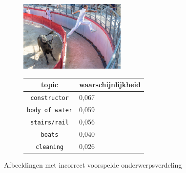 \begin{figure}
\begin{subfigure}{\textwidth}
    \centering
    \begin{minipage}[t][3.5cm]{.5\linewidth}
    \centering
    \vspace{0pt}
    \includegraphics[height=3.5cm]{Images/LDA/7446693604.jpg}
    \end{minipage}\hfill
    \begin{minipage}[t]{.5\textwidth}
    \centering
    \vspace{0pt}
    \begin{tabular}{cl}
            topic                           & waarschijnlijkheid\\
            \hline
            \texttt{constructor}             & 0,067 \\
            \texttt{body of water}                   & 0,059 \\
            \texttt{stairs/rail}                 & 0,056 \\
            \texttt{boats}           & 0,040 \\
            \texttt{cleaning}        & 0,026\\
            \hline
        \end{tabular}
    \end{minipage}
\end{subfigure}
\caption{Afbeeldingen met incorrect voorspelde onderwerpsverdeling}
\end{figure}
